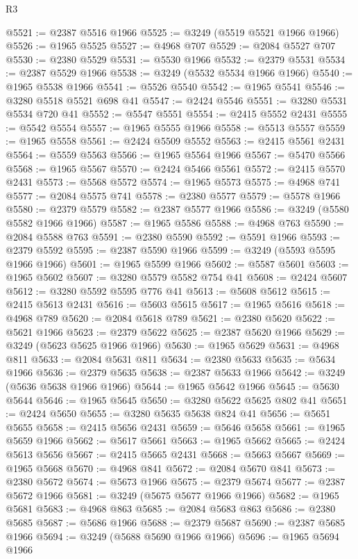 \begin{lexlean}{R3}
\begin{coremodule}
@5521 := @2387 @5516 @1966
@5525 := @3249 (@5519 @5521 @1966 @1966)
@5526 := @1965 @5525
@5527 := @4968 @707
@5529 := @2084 @5527 @707
@5530 := @2380 @5529
@5531 := @5530 @1966
@5532 := @2379 @5531
@5534 := @2387 @5529 @1966
@5538 := @3249 (@5532 @5534 @1966 @1966)
@5540 := @1965 @5538 @1966
@5541 := @5526 @5540
@5542 := @1965 @5541
@5546 := @3280 @5518 @5521 @698 @41
@5547 := @2424 @5546
@5551 := @3280 @5531 @5534 @720 @41
@5552 := @5547 @5551
@5554 := @2415 @5552 @2431
@5555 := @5542 @5554
@5557 := @1965 @5555 @1966
@5558 := @5513 @5557
@5559 := @1965 @5558
@5561 := @2424 @5509 @5552
@5563 := @2415 @5561 @2431
@5564 := @5559 @5563
@5566 := @1965 @5564 @1966
@5567 := @5470 @5566
@5568 := @1965 @5567
@5570 := @2424 @5466 @5561
@5572 := @2415 @5570 @2431
@5573 := @5568 @5572
@5574 := @1965 @5573
@5575 := @4968 @741
@5577 := @2084 @5575 @741
@5578 := @2380 @5577
@5579 := @5578 @1966
@5580 := @2379 @5579
@5582 := @2387 @5577 @1966
@5586 := @3249 (@5580 @5582 @1966 @1966)
@5587 := @1965 @5586
@5588 := @4968 @763
@5590 := @2084 @5588 @763
@5591 := @2380 @5590
@5592 := @5591 @1966
@5593 := @2379 @5592
@5595 := @2387 @5590 @1966
@5599 := @3249 (@5593 @5595 @1966 @1966)
@5601 := @1965 @5599 @1966
@5602 := @5587 @5601
@5603 := @1965 @5602
@5607 := @3280 @5579 @5582 @754 @41
@5608 := @2424 @5607
@5612 := @3280 @5592 @5595 @776 @41
@5613 := @5608 @5612
@5615 := @2415 @5613 @2431
@5616 := @5603 @5615
@5617 := @1965 @5616
@5618 := @4968 @789
@5620 := @2084 @5618 @789
@5621 := @2380 @5620
@5622 := @5621 @1966
@5623 := @2379 @5622
@5625 := @2387 @5620 @1966
@5629 := @3249 (@5623 @5625 @1966 @1966)
@5630 := @1965 @5629
@5631 := @4968 @811
@5633 := @2084 @5631 @811
@5634 := @2380 @5633
@5635 := @5634 @1966
@5636 := @2379 @5635
@5638 := @2387 @5633 @1966
@5642 := @3249 (@5636 @5638 @1966 @1966)
@5644 := @1965 @5642 @1966
@5645 := @5630 @5644
@5646 := @1965 @5645
@5650 := @3280 @5622 @5625 @802 @41
@5651 := @2424 @5650
@5655 := @3280 @5635 @5638 @824 @41
@5656 := @5651 @5655
@5658 := @2415 @5656 @2431
@5659 := @5646 @5658
@5661 := @1965 @5659 @1966
@5662 := @5617 @5661
@5663 := @1965 @5662
@5665 := @2424 @5613 @5656
@5667 := @2415 @5665 @2431
@5668 := @5663 @5667
@5669 := @1965 @5668
@5670 := @4968 @841
@5672 := @2084 @5670 @841
@5673 := @2380 @5672
@5674 := @5673 @1966
@5675 := @2379 @5674
@5677 := @2387 @5672 @1966
@5681 := @3249 (@5675 @5677 @1966 @1966)
@5682 := @1965 @5681
@5683 := @4968 @863
@5685 := @2084 @5683 @863
@5686 := @2380 @5685
@5687 := @5686 @1966
@5688 := @2379 @5687
@5690 := @2387 @5685 @1966
@5694 := @3249 (@5688 @5690 @1966 @1966)
@5696 := @1965 @5694 @1966

\end{coremodule}
\end{lexlean}
